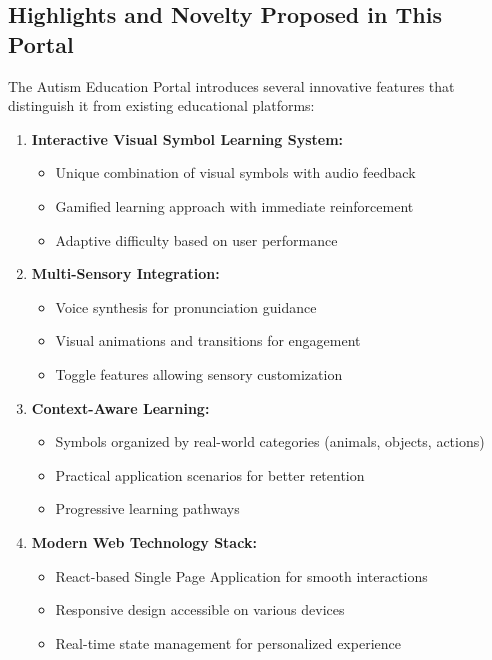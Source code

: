 \documentclass[12pt,a4paper]{article}
\begin{document}
\subsection{Highlights and Novelty Proposed in This Portal}

The Autism Education Portal introduces several innovative features that distinguish it from existing educational platforms:

\begin{enumerate}[leftmargin=*]
    \item \textbf{Interactive Visual Symbol Learning System:}
    \begin{itemize}
        \item Unique combination of visual symbols with audio feedback
        \item Gamified learning approach with immediate reinforcement
        \item Adaptive difficulty based on user performance
    \end{itemize}
    
    \item \textbf{Multi-Sensory Integration:}
    \begin{itemize}
        \item Voice synthesis for pronunciation guidance
        \item Visual animations and transitions for engagement
        \item Toggle features allowing sensory customization
    \end{itemize}
    
    \item \textbf{Context-Aware Learning:}
    \begin{itemize}
        \item Symbols organized by real-world categories (animals, objects, actions)
        \item Practical application scenarios for better retention
        \item Progressive learning pathways
    \end{itemize}
    
    \item \textbf{Modern Web Technology Stack:}
    \begin{itemize}
        \item React-based Single Page Application for smooth interactions
        \item Responsive design accessible on various devices
        \item Real-time state management for personalized experience
    \end{itemize}
    

\end{enumerate}
\end{document}
